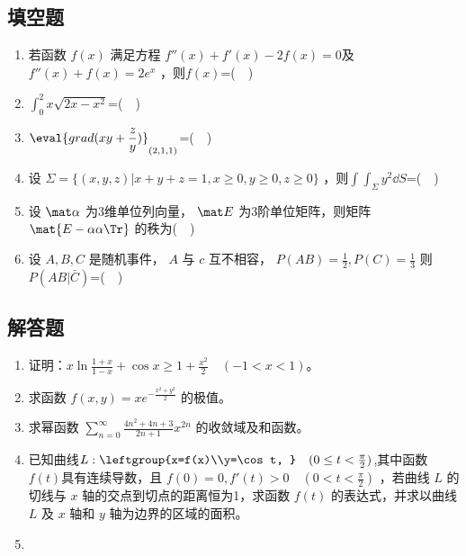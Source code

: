 \subsection{填空题}
\begin{enumerate}
\item 若函数 $f(x)$  满足方程 $f''(x)+f'(x)-2f(x)=0$及$f''(x)+f(x)=2e^x$ ，则$f(x)$=($\quad$)
\item $\displaystyle \int_{0}^{2} x\sqrt{2x-x^2}$=($\quad$)
\item $\displaystyle \eval{ grad(xy+\frac{z}{y})}_{(2,1,1)}$=($\quad$)
\item  设 $\Sigma=\{(x,y,z)|x+y+z=1,x\ge 0,y \ge 0,z \ge 0\}$  ，则$\displaystyle \int \int_\Sigma y^2\dd{S}$=($\quad$)
\item 设 $\mat \alpha$ 为3维单位列向量， $\mat E$ 为3阶单位矩阵，则矩阵 $\mat {E-\alpha\alpha \Tr}$ 的秩为($\quad$)
\item 设 $A,B,C$ 是随机事件， $A$ 与 $c$ 互不相容， $P(AB)=\frac{1}{2},P(C)=\frac{1}{3}$  则 $P(AB|\bar C)$=($\quad$)
\end{enumerate}
\subsection{解答题}
\begin{enumerate}
\item 证明：$\displaystyle x\ln \frac{1+x}{1-x}+\cos x\ge 1+\frac{x^2}{2} \quad (-1<x<1)$。
\item  求函数 $\displaystyle f(x,y)=xe^{-\frac{x^2+y^2}{2}}$  的极值。
\item  求幂函数 $\displaystyle \sum_{n=0}^\infty \frac{4n^2+4n+3}{2n+1}x^{2n}$ 的收敛域及和函数。
\item 已知曲线$L:\leftgroup{x=f(x)\\y=\cos t, }\quad (0 \le t<\frac{\pi}{2} )$,其中函数 $f(t)$具有连续导数，且 $f(0)=0,f'(t)>0 \quad (0<t<\frac{\pi}{2})$  ，若曲线 $L$ 的切线与 $x$ 轴的交点到切点的距离恒为1，求函数 $f(t)$ 的表达式，并求以曲线 $L$  及 $x$ 轴和 $y$ 轴为边界的区域的面积。
\item  
\end{enumerate}
